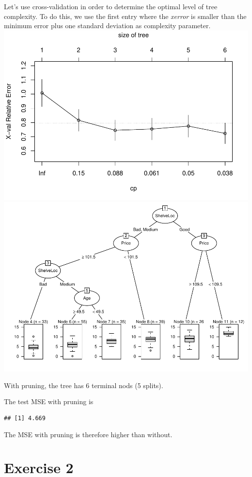 \documentclass[
]{article}
\begin{document}
Let's use cross-validation in order to determine the optimal level of
tree complexity. To do this, we use the first entry where the
\textit{xerror} is smaller than the minimum error plus one standard
deviation as complexity parameter.
\includegraphics{A3_files/figure-latex/unnamed-chunk-7-1.pdf}
\includegraphics{A3_files/figure-latex/unnamed-chunk-7-2.pdf}

With pruning, the tree has 6 terminal nods (5 splits).

The test MSE with pruning is

\begin{verbatim}
## [1] 4.669
\end{verbatim}

The MSE with pruning is therefore higher than without.

\section{Exercise 2}\label{exercise-2}
\end{document}
